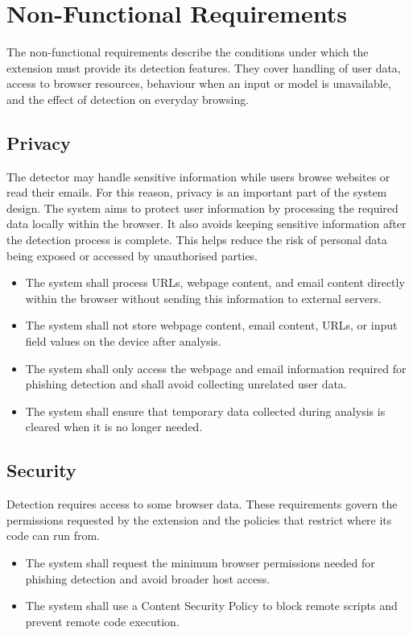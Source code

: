 \documentclass{FastFyp}
\begin{document}
\section{Non-Functional Requirements}
The non-functional requirements describe the conditions under which the extension must provide its detection features. They cover handling of user data, access to browser resources, behaviour when an input or model is unavailable, and the effect of detection on everyday browsing.

\subsection{Privacy}
The detector may handle sensitive information while users browse websites or read their emails. For this reason, privacy is an important part of the system design. The system aims to protect user information by processing the required data locally within the browser. It also avoids keeping sensitive information after the detection process is complete. This helps reduce the risk of personal data being exposed or accessed by unauthorised parties.

\begin{itemize}
    \item The system shall process URLs, webpage content, and email content directly within the browser without sending this information to external servers.

    \item The system shall not store webpage content, email content, URLs, or input field values on the device after analysis.

    \item The system shall only access the webpage and email information required for phishing detection and shall avoid collecting unrelated user data.

    \item The system shall ensure that temporary data collected during analysis is cleared when it is no longer needed.
\end{itemize}

\subsection{Security}
Detection requires access to some browser data. These requirements govern the permissions requested by the extension and the policies that restrict where its code can run from.

\begin{itemize}
    \item The system shall request the minimum browser permissions needed for phishing detection and avoid broader host access.
    \item The system shall use a Content Security Policy to block remote scripts and prevent remote code execution.
\end{itemize}
\end{document}
